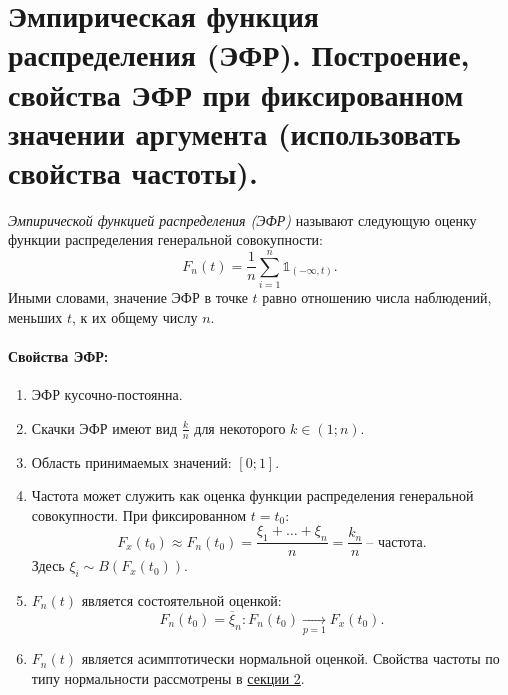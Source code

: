 \section{Эмпирическая функция распределения (ЭФР). Построение, свойства ЭФР при
фиксированном значении аргумента (использовать свойства частоты).}

\begin{definition}
    \textit{Эмпирической функцией распределения (ЭФР)} называют следующую оценку
    функции распределения генеральной совокупности:
    \[
        F_n(t) = \frac{1}{n} \sum_{i = 1}^{n} \mathbb{1}_{(-\infty, t)}
    .\]
    Иными словами, значение ЭФР в точке $t$ равно отношению числа наблюдений,
    меньших $t$, к их общему числу $n$.
\end{definition}

\paragraph{Свойства ЭФР:}

\begin{enumerate}
    \item ЭФР кусочно-постоянна.
    \item Скачки ЭФР имеют вид $\frac{k}{n}$ для некоторого $k \in (1; n)$.
    \item Область принимаемых значений: $[0; 1]$.
    \item Частота может служить как оценка функции распределения генеральной
        совокупности. При фиксированном $t = t_0$:
        \[
            F_x(t_0) \approx F_n(t_0) = \frac{\xi_1 + \ldots + \xi_n}{n} =
            \frac{k_n}{n}~ \text{-- частота}
        .\]
        Здесь $\xi_i \sim B(F_x(t_0))$.
    \item $F_n(t)$ является состоятельной оценкой:
        \[
            F_n(t_0) = \overline{\xi}_n: F_n(t_0) \xrightarrow[p = 1]{} F_x(t_0)
        .\]
    \item $F_n(t)$ является асимптотически нормальной оценкой. Свойства частоты
    по типу нормальности рассмотрены в \hyperref[sec:normfreq]{секции 2}.
\end{enumerate}

